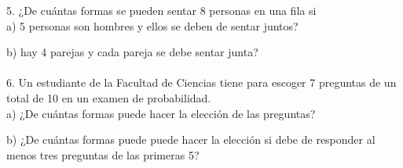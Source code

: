 \documentclass[12pt,a4paper]{report}
\begin{document}
    5. ¿De cuántas formas se pueden sentar 8 personas en una fila si\\

        a) 5 personas son hombres y ellos se deben de sentar juntos?

        b) hay 4 parejas y cada pareja se debe sentar junta?\\\\

    6. Un estudiante de la Facultad de Ciencias tiene para escoger 7 preguntas
       de un total de 10 en un examen de probabilidad.\\

       a) ¿De cuántas formas puede hacer la elección de las preguntas?

       b) ¿De cuántas formas puede puede hacer la elección si debe de responder
          al menos tres preguntas de las primeras 5?\\\\
\end{document}
